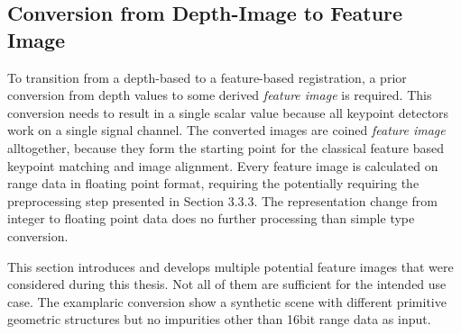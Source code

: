 \subsection{Conversion from Depth-Image to Feature Image}\label{sec:feature_images}

To transition from a depth-based to a feature-based registration, a prior conversion from depth values to some derived \emph{feature image} is required.
This conversion needs to result in a single scalar value because all keypoint detectors work on a single signal channel.
The converted images are coined \emph{feature image} alltogether, because they form the starting point for the classical feature based keypoint matching and image alignment.
Every feature image is calculated on range data in floating point format, requiring the potentially requiring the preprocessing step presented in Section 3.3.3.
The representation change from integer to floating point data does no further processing than simple type conversion.

This section introduces and develops multiple potential feature images that were considered during this thesis.
Not all of them are sufficient for the intended use case.
The examplaric conversion show a synthetic scene with different primitive geometric structures but no impurities other than 16bit range data as input.






